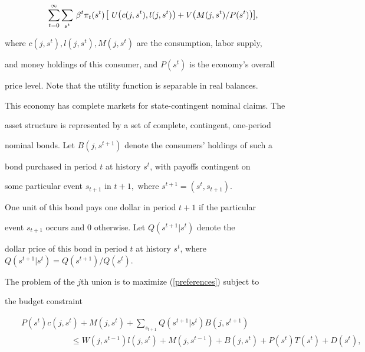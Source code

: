 \documentclass[fleqn,leqno,11pt]{article}
\begin{document}
\begin{equation}

\sum_{t=0}^{\infty }\sum_{s^{t}}\,\beta ^{t}\pi _{t}(s^{t})\,\text{{\large [}%

}U\text{{\large (}}c(j,s^{t}),l(j,s^{t})\text{{\large )}}+V\text{{\large (}}%

M(j,s^{t})/P(s^{t})\text{{\large )]}},  \label{preferences}

\end{equation}%

where $c(j,s^{t}),l(j,s^{t}),M(j,s^{t})$ are the consumption, labor supply,

and money holdings of this consumer, and $P(s^{t})$ is the economy's overall

price level. Note that the utility function is separable in real balances.

This economy has complete markets for state-contingent nominal claims. The

asset structure is represented by a set of complete, contingent, one-period

nominal bonds. Let $B(j,s^{t+1})$ denote the consumers' holdings of such a

bond purchased in period $t$ at history $s^{t}$, with payoffs contingent on

some particular event $s_{t+1}$ in $t+1,$ where $s^{t+1}=(s^{t},s_{t+1})$.

One unit of this bond pays one dollar in period $t+1$ if the particular

event $s_{t+1}$ occurs and $0$ otherwise. Let $Q(s^{t+1}|s^{t})$ denote the

dollar price of this bond in period $t$ at history $s^{t}$, where $%

Q(s^{t+1}|s^{t})=Q(s^{t+1})/Q(s^{t}).$



The problem of the $j$th union is to maximize (\ref{preferences}) subject to

the budget constraint 

\begin{eqnarray*}

&&P(s^{t})c(j,s^{t})+M(j,s^{t})+\sum_{s_{t+1}}Q(s^{t+1}|s^{t})B(j,s^{t+1}) \\

&&\qquad \qquad \qquad \leq

W(j,s^{t-1})l(j,s^{t})+M(j,s^{t-1})+B(j,s^{t})+P(s^{t})T(s^{t})+D(s^{t}),

\end{eqnarray*}
\end{document}
